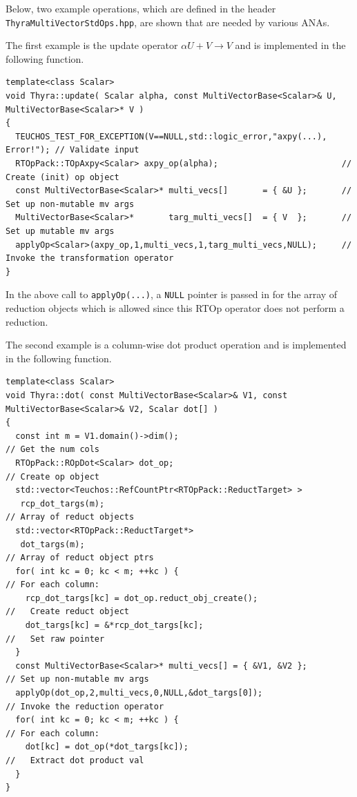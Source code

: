 \documentclass[pdf,ps2pdf,11pt]{SANDreport}
\begin{document}
Below, two example operations, which are defined in the header
{}\texttt{Thyra\-Multi\-Vector\-Std\-Ops.hpp}, are shown that are
needed by various ANAs.

The first example is the update operator $\alpha U + V \rightarrow V$
and is implemented in the following function.

{\scriptsize\begin{verbatim}
template<class Scalar>
void Thyra::update( Scalar alpha, const MultiVectorBase<Scalar>& U, MultiVectorBase<Scalar>* V )
{
  TEUCHOS_TEST_FOR_EXCEPTION(V==NULL,std::logic_error,"axpy(...), Error!"); // Validate input
  RTOpPack::TOpAxpy<Scalar> axpy_op(alpha);                         // Create (init) op object
  const MultiVectorBase<Scalar>* multi_vecs[]       = { &U };       // Set up non-mutable mv args
  MultiVectorBase<Scalar>*       targ_multi_vecs[]  = { V  };       // Set up mutable mv args
  applyOp<Scalar>(axpy_op,1,multi_vecs,1,targ_multi_vecs,NULL);     // Invoke the transformation operator
}
\end{verbatim}}

{}\noindent{}In the above call to {}\texttt{applyOp(\-...)}, a
{}\texttt{NULL} pointer is passed in for the array of reduction
objects which is allowed since this RTOp operator does not perform a
reduction.

The second example is a column-wise dot product operation and is
implemented in the following function.

{\scriptsize\begin{verbatim}
template<class Scalar>
void Thyra::dot( const MultiVectorBase<Scalar>& V1, const MultiVectorBase<Scalar>& V2, Scalar dot[] )
{
  const int m = V1.domain()->dim();                                      // Get the num cols
  RTOpPack::ROpDot<Scalar> dot_op;                                       // Create op object
  std::vector<Teuchos::RefCountPtr<RTOpPack::ReductTarget> >
   rcp_dot_targs(m);                                                     // Array of reduct objects
  std::vector<RTOpPack::ReductTarget*>
   dot_targs(m);                                                         // Array of reduct object ptrs
  for( int kc = 0; kc < m; ++kc ) {                                      // For each column:
    rcp_dot_targs[kc] = dot_op.reduct_obj_create();                      //   Create reduct object
    dot_targs[kc] = &*rcp_dot_targs[kc];                                 //   Set raw pointer
  }
  const MultiVectorBase<Scalar>* multi_vecs[] = { &V1, &V2 };            // Set up non-mutable mv args
  applyOp(dot_op,2,multi_vecs,0,NULL,&dot_targs[0]);                     // Invoke the reduction operator
  for( int kc = 0; kc < m; ++kc ) {                                      // For each column:
    dot[kc] = dot_op(*dot_targs[kc]);                                    //   Extract dot product val
  }
}
\end{verbatim}}
\end{document}
